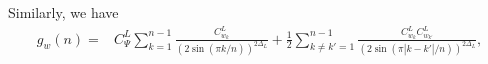 \documentclass[11pt]{article}
\newcommand{\mO}{\mathcal{O}}
\newcommand{\nn}{\nonumber}
\begin{document}
  Similarly, we have
  \begin{align}\label{gnw}
    g_{w}(n)= & C_{\Psi}^L\sum_{k=1}^{n-1}\frac{C_{w_k}^L}{(2\sin(\pi k/n))^{2\Delta_L}}+\frac{1}{2}\sum_{k\neq k'=1}^{n-1}\frac{C_{w_k}^LC_{w_{k'}}^L}{(2\sin(\pi |k-k'|/n))^{2\Delta_L}}, %
  \end{align}
\end{document}
